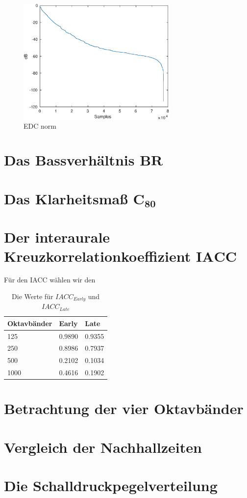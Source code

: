 \begin{figure}[H]
    \center
    \includegraphics[width = 0.7\textwidth]{figures/EDC_norm.eps}
    \caption{EDC norm}
    \label{fig:edc}
\end{figure}

\section{Das Bassverhältnis $\mathbf{BR}$}
\label{sec:br}


\section{Das Klarheitsmaß $\mathbf{C_{80}}$}
\label{sec:c80}


\section{Der interaurale Kreuzkorrelationkoeffizient $\mathbf{IACC}$}
\label{sec:iacc}
Für den IACC wählen wir den

\begin{table}
    \centering
    \caption{Die Werte für $IACC_{Early}$ und $IACC_{Late}$}
    \label{tab:iacc}
    \begin{tabular}[\textwidth]{|l|l|l|}
        \hline
        Oktavbänder & Early & Late \\
        \hline
        125 & 0.9890 & 0.9355 \\
        \hline
        250 & 0.8986 & 0.7937 \\
        \hline
        500 & 0.2102 & 0.1034 \\
        \hline
        1000 & 0.4616 & 0.1902 \\
        \hline
    \end{tabular}
\end{table}

\section{Betrachtung der vier Oktavbänder}
\label{sec:bands}


\section{Vergleich der Nachhallzeiten}
\label{sec:ts}


\section{Die Schalldruckpegelverteilung}
\label{sec:sdpv}